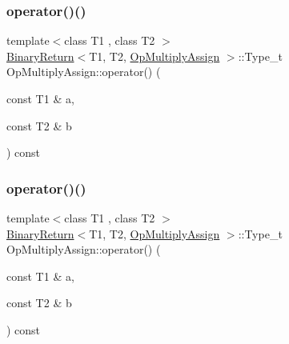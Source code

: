 \subsubsection{\texorpdfstring{operator()()}{operator()()}\hspace{0.1cm}{\footnotesize\ttfamily [1/3]}}
{\footnotesize\ttfamily template$<$class T1 , class T2 $>$ \\
\mbox{\hyperlink{structBinaryReturn}{Binary\+Return}}$<$T1, T2, \mbox{\hyperlink{structOpMultiplyAssign}{Op\+Multiply\+Assign}} $>$\+::Type\+\_\+t Op\+Multiply\+Assign\+::operator() (\begin{DoxyParamCaption}\item[{const T1 \&}]{a,  }\item[{const T2 \&}]{b }\end{DoxyParamCaption}) const\hspace{0.3cm}{\ttfamily [inline]}}

\mbox{\label{structOpMultiplyAssign_a2b6f7db01199e1f98d9c495d9f3275bb}} 
\subsubsection{\texorpdfstring{operator()()}{operator()()}\hspace{0.1cm}{\footnotesize\ttfamily [2/3]}}
{\footnotesize\ttfamily template$<$class T1 , class T2 $>$ \\
\mbox{\hyperlink{structBinaryReturn}{Binary\+Return}}$<$T1, T2, \mbox{\hyperlink{structOpMultiplyAssign}{Op\+Multiply\+Assign}} $>$\+::Type\+\_\+t Op\+Multiply\+Assign\+::operator() (\begin{DoxyParamCaption}\item[{const T1 \&}]{a,  }\item[{const T2 \&}]{b }\end{DoxyParamCaption}) const\hspace{0.3cm}{\ttfamily [inline]}}

\mbox{\label{structOpMultiplyAssign_a2b6f7db01199e1f98d9c495d9f3275bb}} 
